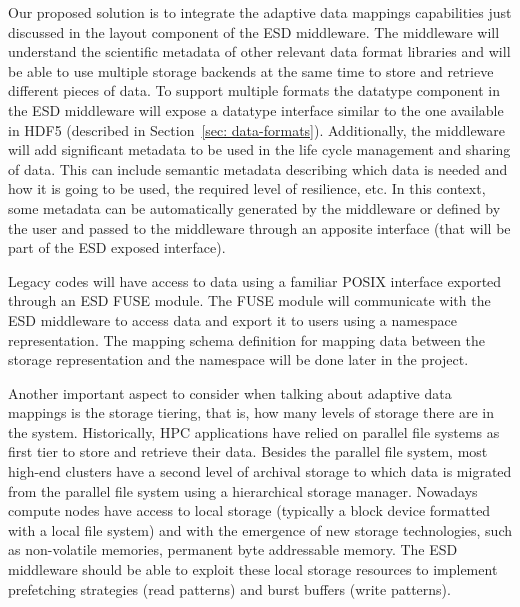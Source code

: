 Our proposed solution is to integrate the adaptive data mappings capabilities just discussed in the layout component of the ESD middleware. The middleware will understand the scientific metadata of other relevant data format libraries and will be able to use multiple storage backends at the same time to store and retrieve different pieces of data. To support multiple formats the datatype component in the ESD middleware will expose a datatype interface similar to the one available in HDF5 (described in Section~\ref{sec: data-formats}). Additionally, the middleware will add significant metadata to be used in the life cycle management and sharing of data. This can include semantic metadata describing which data is needed and how it is going to be used, the required level of resilience, etc. In this context, some metadata can be automatically generated by the middleware or defined by the user and passed to the middleware through an apposite interface (that will be part of the ESD exposed interface).

Legacy codes will have access to data using a familiar POSIX interface exported through an ESD FUSE module. The FUSE module will communicate with the ESD middleware to access data and export it to users using a namespace representation. The mapping schema definition for mapping data between the storage representation and the namespace will be done later in the project.

Another important aspect to consider when talking about adaptive data mappings is the storage tiering, that is, how many levels of storage there are in the system. Historically, HPC applications have relied on parallel file systems as first tier to store and retrieve their data. Besides the parallel file system, most high-end clusters have a second level of archival storage to which data is migrated from the parallel file system using a hierarchical storage manager. Nowadays compute nodes have access to local storage (typically a block device formatted with a local file system) and with the emergence of new storage technologies, such as non-volatile memories, permanent byte addressable memory. The ESD middleware should be able to exploit these local storage resources to implement prefetching strategies (read patterns) and burst buffers (write patterns).

